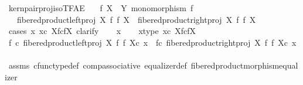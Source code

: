 \begin{isabellebody}
\isamarkupfalse%
\ kern{\isacharunderscore}{\kern0pt}pair{\isacharunderscore}{\kern0pt}proj{\isacharunderscore}{\kern0pt}iso{\isacharunderscore}{\kern0pt}TFAE{}{\isacharcolon}{\kern0pt}\isanewline
\ \ \ {\isachardoublequoteopen}f{\isacharcolon}{\kern0pt}\ X\ {\isasymrightarrow}\ Y{\isachardoublequoteclose}\ {\isachardoublequoteopen}monomorphism\ f{\isachardoublequoteclose}\isanewline
\ \ \ {\isachardoublequoteopen}{\isacharparenleft}{\kern0pt}fibered{\isacharunderscore}{\kern0pt}product{\isacharunderscore}{\kern0pt}left{\isacharunderscore}{\kern0pt}proj\ X\ f\ f\ X{\isacharparenright}{\kern0pt}\ {\isacharequal}{\kern0pt}\ {\isacharparenleft}{\kern0pt}fibered{\isacharunderscore}{\kern0pt}product{\isacharunderscore}{\kern0pt}right{\isacharunderscore}{\kern0pt}proj\ X\ f\ f\ X{\isacharparenright}{\kern0pt}{\isachardoublequoteclose}\isanewline
%
\isadelimproof
%
\endisadelimproof
%
\isatagproof
{}\isamarkupfalse%
\ {\isacharparenleft}{\kern0pt}cases\ {\isachardoublequoteopen}{\isasymexists}x{\isachardot}{\kern0pt}\ x{\isasymin}\isactrlsub c\ X\isactrlbsub f\isactrlesub {\isasymtimes}\isactrlsub c\isactrlbsub f\isactrlesub X{\isachardoublequoteclose}{\isacharcomma}{\kern0pt}\ clarify{\isacharparenright}{\kern0pt}\isanewline
\ \ \isamarkupfalse%
\ x\isanewline
\ \ \isamarkupfalse%
\ x{\isacharunderscore}{\kern0pt}type{\isacharcolon}{\kern0pt}\ {\isachardoublequoteopen}x{\isasymin}\isactrlsub c\ X\isactrlbsub f\isactrlesub {\isasymtimes}\isactrlsub c\isactrlbsub f\isactrlesub X{\isachardoublequoteclose}\isanewline
\ \ \isamarkupfalse%
\ \isamarkupfalse%
\ {\isachardoublequoteopen}{\isacharparenleft}{\kern0pt}f\ {\isasymcirc}\isactrlsub c\ {\isacharparenleft}{\kern0pt}fibered{\isacharunderscore}{\kern0pt}product{\isacharunderscore}{\kern0pt}left{\isacharunderscore}{\kern0pt}proj\ X\ f\ f\ X{\isacharparenright}{\kern0pt}{\isacharparenright}{\kern0pt}{\isasymcirc}\isactrlsub c\ x\ {\isacharequal}{\kern0pt}\ {\isacharparenleft}{\kern0pt}f{\isasymcirc}\isactrlsub c\ {\isacharparenleft}{\kern0pt}fibered{\isacharunderscore}{\kern0pt}product{\isacharunderscore}{\kern0pt}right{\isacharunderscore}{\kern0pt}proj\ X\ f\ f\ X{\isacharparenright}{\kern0pt}{\isacharparenright}{\kern0pt}{\isasymcirc}\isactrlsub c\ x{\isachardoublequoteclose}\isanewline
\ \ \ \ \isamarkupfalse%
\ assms\ cfunc{\isacharunderscore}{\kern0pt}type{\isacharunderscore}{\kern0pt}def\ comp{\isacharunderscore}{\kern0pt}associative\ equalizer{\isacharunderscore}{\kern0pt}def\ fibered{\isacharunderscore}{\kern0pt}product{\isacharunderscore}{\kern0pt}morphism{\isacharunderscore}{\kern0pt}equalizer\isanewline

\end{isabellebody}
